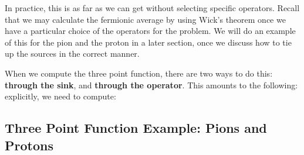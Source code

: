 \documentclass[11pt, oneside]{article}   	%
\theoremstyle{definition}
\begin{document}
In practice, this is as far as we can get without selecting specific operators. Recall that we may calculate the fermionic average by using Wick's 
theorem once we have a particular choice of the operators for the problem. We will do an example of this for the pion and the proton in a later 
section, once we discuss how to tie up the sources in the correct manner. 

When we compute the three point function, there are two ways to do this: \textbf{through the sink}, and \textbf{through the operator}. This amounts to 
the following: explicitly, we need to compute:

\subsection{Three Point Function Example: Pions and Protons}
\end{document}
